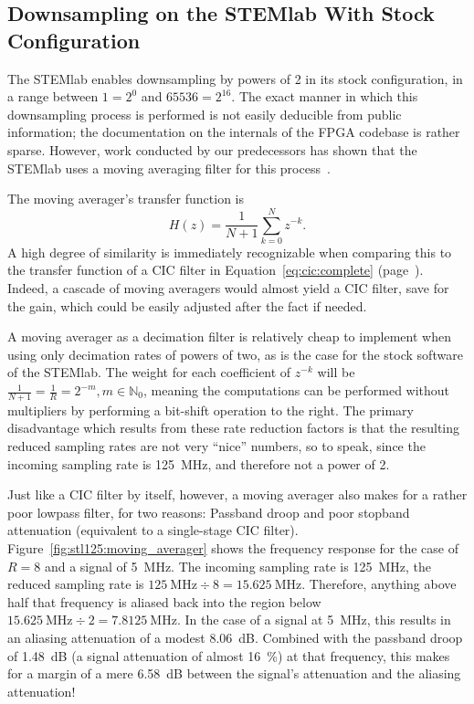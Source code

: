 \subsection{Downsampling on the STEMlab With Stock Configuration} %
\label{subsec:stl125:ds_default}

The  STEMlab  enables   downsampling  by  powers  of  \num{2}   in  its  stock
configuration, in a range  between $1 = 2^0$ and $65536  = 2^{16}$.  The exact
manner in which this downsampling process is performed is not easily deducible
from  public information;  the  documentation  on the  internals  of the  FPGA
codebase  is  rather  sparse. However,  work  conducted  by  our  predecessors
has  shown  that  the  STEMlab  uses   a  moving  averaging  filter  for  this
process~\cite{bucher:kuery}.

The moving averager's transfer function is
\begin{equation}
    \label{eq:moving_averager}
    H(z) = \frac{1}{N+1}\sum_{k = 0}^{N} z^{-k}.
\end{equation}
A high degree of similarity is immediately recognizable when comparing this to
the  transfer  function  of  a CIC  filter  in  Equation~\ref{eq:cic:complete}
(page~\pageref{eq:cic:complete}). Indeed, a cascade  of moving averagers would
almost yield a CIC  filter, save for the gain, which  could be easily adjusted
after the fact if needed.

A moving averager as a decimation filter is relatively cheap to implement when
using only  decimation rates of powers  of two, as  is the case for  the stock
software of the  STEMlab. The weight for each coefficient of  $z^{-k}$ will be
$\frac{1}{N+1}  =  \frac{1}{R} =  2^{-m},  m  \in \mathbb{N}_0$,  meaning  the
computations can  be performed without  multipliers by performing  a bit-shift
operation to the right. The primary disadvantage which results from these rate
reduction  factors  is that  the  resulting  reduced  sampling rates  are  not
very  ``nice'' numbers,  so  to speak,  since the  incoming  sampling rate  is
\SI{125}{\MHz}, and therefore not a power of \num{2}.

Just  like a  CIC filter  by  itself, however,  a moving  averager also  makes
for  a  rather  poor  lowpass  filter, for  two  reasons: Passband  droop  and
poor  stopband   attenuation  (equivalent  to  a   single-stage  CIC  filter).
Figure~\ref{fig:stl125:moving_averager} shows  the frequency response  for the
case of  $R=8$ and  a signal  of \SI{5}{\MHz}. The  incoming sampling  rate is
\SI{125}{\MHz},  the  reduced  sampling  rate  is  $\SI{125}{\MHz}  \div  8  =
\SI{15.625}{\MHz}$. Therefore, anything  above half that frequency  is aliased
back into the region below $\SI{15.625}{\MHz} \div 2 = \SI{7.8125}{\MHz}$.  In
the case of a signal at  \SI{5}{\MHz}, this results in an aliasing attenuation
of a modest \SI{8.06}{\dB}. Combined with the passband droop of \SI{1.48}{\dB}
(a signal  attenuation of  almost \SI{16}{\percent})  at that  frequency, this
makes for a  margin of a mere \SI{6.58}{\dB} between  the signal's attenuation
and the aliasing attenuation!

